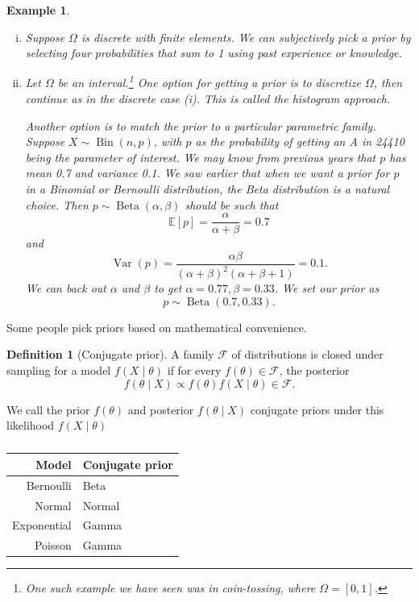 \documentclass{tufte-handout}
\newcommand*\E{\mathbb{E}}
\newtheorem{ex}[thm]{Example}
\theoremstyle{definition}
\newtheorem{defn}[thm]{Definition}
\begin{document}
\begin{ex}
	\begin{enumerate}[(i)]
		\item Suppose $\Omega$ is discrete with finite elements. We can subjectively pick a prior by selecting four probabilities that sum to 1 using past experience or knowledge.
		\item Let $\Omega$ be an interval.\footnote{One such example we have seen was in coin-tossing, where $\Omega = [0,1]$.} One option for getting a prior is to discretize $\Omega$, then continue as in the discrete case (i). This is called the \emph{histogram approach}.

			Another option is to match the prior to a particular parametric family. Suppose $X\sim  \operatorname{Bin}(n,p)$, with $p$ as the probability of getting an A in 24410 being the parameter of interest. We may know from previous years that $p$ has mean 0.7 and variance 0.1. We saw earlier that when we want a prior for $p$ in a Binomial or Bernoulli distribution, the Beta distribution is a natural choice.
			Then $p \sim  \operatorname{Beta}(\alpha,\beta)$ should be such that \[
				\E\left[p\right] = \frac{\alpha}{\alpha+\beta} = 0.7
			\] and \[
				\operatorname{Var}\left(p\right) = \frac{\alpha \beta}{\left( \alpha+\beta \right)^2 \left( \alpha+\beta+1 \right)} = 0.1
			.\] We can back out $\alpha$ and $\beta$ to get $\alpha = 0.77, \beta = 0.33$. We set our prior as \[
				p \sim \operatorname{Beta}\left( 0.7,0.33 \right)
			.\] 
	\end{enumerate}
\end{ex}

 Some people pick priors based on mathematical convenience. 
\begin{defn}[Conjugate prior]
	A family $\mathscr{F}$ of distributions is closed under sampling for a model $f(X \mid \theta)$ if for every $f(\theta) \in \mathscr{F}$, the posterior \[
		f(\theta \mid X) \propto f(\theta) f(X \mid \theta) \in \mathscr{F}
	.\]

	We call the prior $f(\theta)$ and posterior $f(\theta \mid X)$ conjugate priors under this likelihood $f(X\mid \theta)$
\end{defn}

\begin{table}[htpb]
	\centering
	\caption{}
	\label{tab:conj-prior}
	\begin{tabular}{rl}
		Model & Conjugate prior \\
	\hline 
	Bernoulli & Beta \\
	Normal & Normal \\
	Exponential & Gamma \\
	Poisson & Gamma
	\end{tabular}
\end{table}
\end{document}
